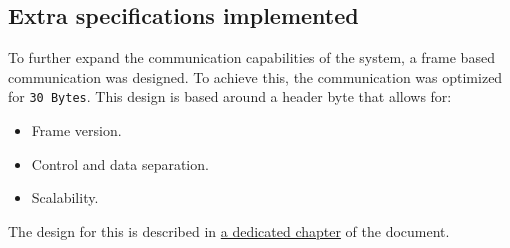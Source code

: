 \subsection{Extra specifications implemented}

To further expand the communication capabilities of the system, a frame based communication was designed. To achieve this, 
the communication was optimized for \texttt{30 Bytes}. This design is based around a header byte that allows for:
\begin{itemize}
    \item Frame version.
    \item Control and data separation.
    \item Scalability.
\end{itemize}

The design for this is described in \hyperref[advanced]{a dedicated chapter} of the document.
